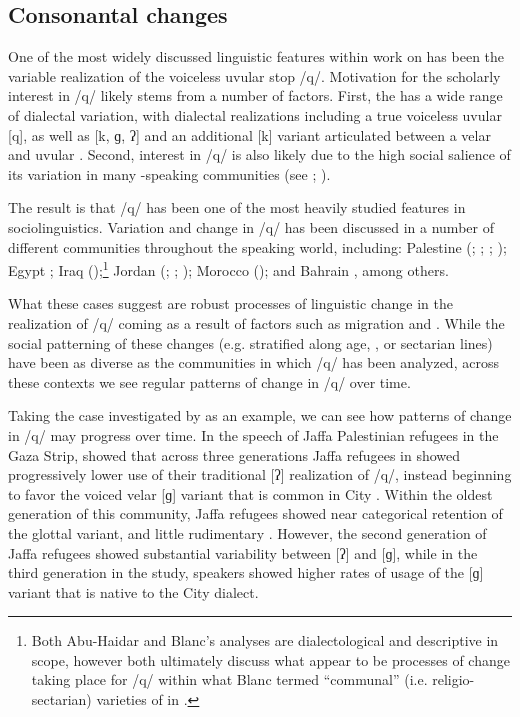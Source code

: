 \documentclass[output=paper]{langsci/langscibook}
\begin{document}
 
 \subsection{Consonantal changes}


One of the most widely discussed linguistic features within work on   has been the variable realization of the voiceless uvular stop /q/. Motivation for the scholarly interest in /q/ likely stems from a number of factors. First, the  has a wide range of dialectal variation, with dialectal realizations including a true voiceless uvular [q], as well as [k, ɡ, ʔ] and an additional [k] variant articulated between a velar and uvular \citep{Shahin2011}. Second, interest in /q/ is also likely due to the high social salience of its variation in many -speaking communities (see \citealt{Hachimi2012}; \citealt{CotterHoresh2015}). 

  The result is that /q/ has been one of the most heavily studied features in  sociolinguistics. Variation and change in /q/ has been discussed in a number of different communities throughout the  speaking world, including: Palestine (\citealt{AbdEl-Jawad1987}; \citealt{Al-Shareef2002}; \citealt{CotterHoresh2015}; \citealt{Cotter2016}); Egypt \citep{Haeri1997}; Iraq (\citealt{Blanc1964,Abu-Haidar1991});\footnote{Both Abu-Haidar and Blanc’s analyses are dialectological and descriptive in scope, however both ultimately discuss what appear to be processes of change taking place for /q/ within what Blanc termed “communal” (i.e. religio-sectarian) varieties of  in .}  Jordan (\citealt{AbdEl-Jawad1981}; \citealt{Al-Wer2007}; \citealt{Al-WerHerin2011}); Morocco (\citealt{Hachimi2007,Hachimi2012}); and Bahrain \citep{Holes1987}, among others. 

  What these cases suggest are robust processes of linguistic change in the realization of /q/ coming as a result of factors such as migration and . While the social patterning of these changes (e.g. stratified along age, , or sectarian lines) have been as diverse as the communities in which /q/ has been analyzed, across these contexts we see regular patterns of change in /q/ over time. 

  Taking the case investigated by \citet{Cotter2016} as an example, we can see how patterns of change in /q/ may progress over time. In the speech of Jaffa Palestinian refugees in the Gaza Strip, \citet{Cotter2016} showed that across three generations Jaffa refugees in  showed progressively lower use of their traditional [ʔ] realization of /q/, instead beginning to favor the voiced velar [ɡ] variant that is common in  City . Within the oldest generation of this community, Jaffa refugees showed near categorical retention of the glottal variant, and little rudimentary . However, the second generation of Jaffa refugees showed substantial variability between [ʔ] and [ɡ], while in the third generation in the study, speakers showed higher rates of usage of the [ɡ] variant that is native to the  City dialect. 
\end{document}
